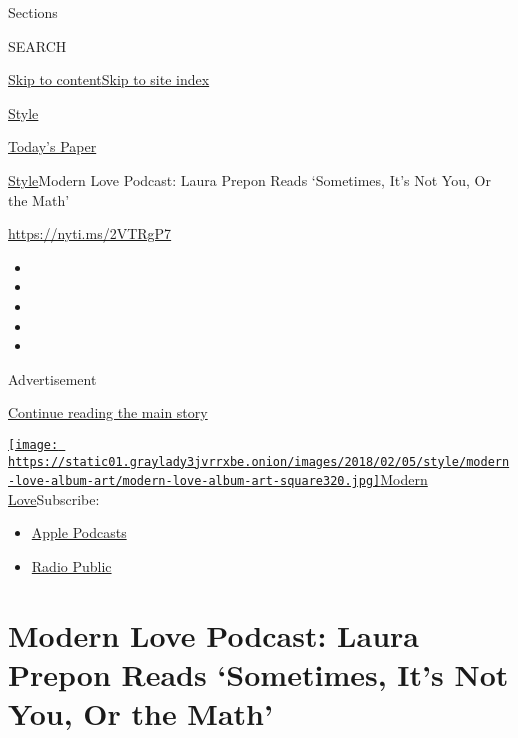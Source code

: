 Sections

SEARCH

\protect\hyperlink{site-content}{Skip to
content}\protect\hyperlink{site-index}{Skip to site index}

\href{https://www.nytimes3xbfgragh.onion/section/style}{Style}

\href{https://myaccount.nytimes3xbfgragh.onion/auth/login?response_type=cookie\&client_id=vi}{}

\href{https://www.nytimes3xbfgragh.onion/section/todayspaper}{Today's
Paper}

\href{/section/style}{Style}\textbar{}Modern Love Podcast: Laura Prepon
Reads `Sometimes, It's Not You, Or the Math'

\href{https://nyti.ms/2VTRgP7}{https://nyti.ms/2VTRgP7}

\begin{itemize}
\item
\item
\item
\item
\item
\end{itemize}

Advertisement

\protect\hyperlink{after-top}{Continue reading the main story}

\href{https://www.nytimes3xbfgragh.onion/column/modern-love-podcast}{\texttt{[image: https://static01.graylady3jvrrxbe.onion/images/2018/02/05/style/modern-love-album-art/modern-love-album-art-square320.jpg]}Modern
Love}Subscribe:

\begin{itemize}
\tightlist
\item
  \href{https://itunes.apple.com/us/podcast/id1065559535}{Apple
  Podcasts}
\item
  \href{https://play.radiopublic.com/modern-love-k6pYB8}{Radio Public}
\end{itemize}

\hypertarget{modern-love-podcast-laura-prepon-reads-sometimes-its-not-you-or-the-math}{%
\section{Modern Love Podcast: Laura Prepon Reads `Sometimes, It's Not
You, Or the
Math'}\label{modern-love-podcast-laura-prepon-reads-sometimes-its-not-you-or-the-math}}

\hypertarget{section}{%
\subsection{}\label{section}}

